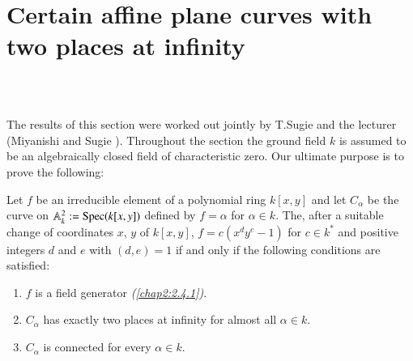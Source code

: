 \section{Certain affine plane curves with two places at
  infinity}\label{chap2:sec6}\pageoriginale\ 

\subsection{}\label{chap2:6.1}
The results of this section were worked out jointly by T.\@ Sugie and
the lecturer (\cf Miyanishi and Sugie \cite{37}). Throughout the
section the ground field $k$ is assumed to be an algebraically closed
field of characteristic zero. Our ultimate purpose is to prove the
following:

\begin{theorem*}
Let $f$ be an irreducible element of a polynomial ring $k[x,y]$ and
let $C_{\alpha}$ be the curve on $\mathbb{A}^{2}_{k}:=\operatorname{Spec}(k[x,y])$
defined by $f=\alpha$ for $\alpha\in k$. The, after a suitable change
of coordinates $x$, $y$ of $k[x,y]$, $f=c(x^{d}y^{e}-1)$ for $c\in
k^{\ast}$ and positive integers $d$ and $e$ with $(d,e)=1$ if and only
if the following conditions are satisfied:
\begin{enumerate}
\renewcommand{\labelenumi}{\rm(\theenumi)}
\item $f$ is a field generator {\em(\cf \ref{chap2:2.4.1})}.

\item $C_{\alpha}$ has exactly two places at infinity for almost all
  $\alpha\in k$.

\item $C_{\alpha}$ is connected for every $\alpha\in k$.
\end{enumerate}
\end{theorem*}

